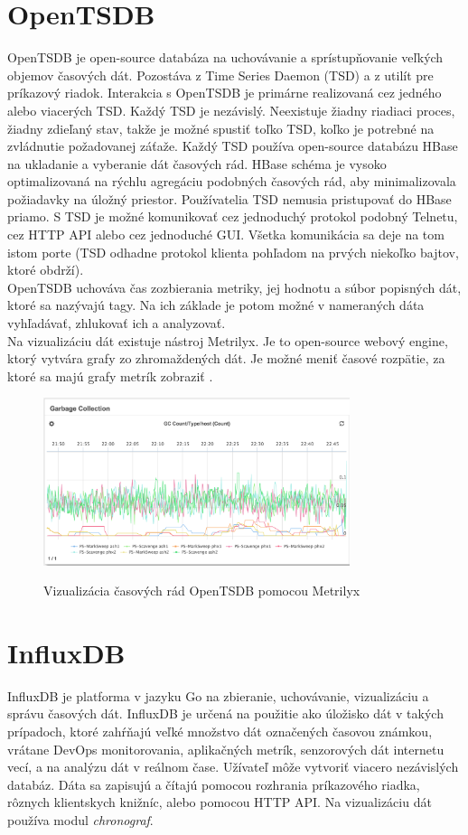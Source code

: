 \documentclass[11pt,final,oneside]{fithesis}
\begin{document}
\section{OpenTSDB}
OpenTSDB je open-source databáza na uchovávanie a sprístupňovanie veľkých objemov časových dát. Pozostáva z Time Series Daemon (TSD) a z utilít pre príkazový riadok. Interakcia s OpenTSDB je primárne realizovaná cez jedného alebo viacerých TSD. Každý TSD je nezávislý.
Neexistuje žiadny riadiaci proces, žiadny zdieľaný stav, takže je možné spustiť toľko TSD, koľko je potrebné na zvládnutie požadovanej záťaže. Každý TSD používa open-source databázu HBase
na ukladanie a vyberanie dát časových rád. HBase schéma je vysoko optimalizovaná na rýchlu agregáciu podobných časových rád, aby minimalizovala požiadavky na úložný priestor. 
Používatelia TSD nemusia pristupovať do HBase priamo. S TSD je možné komunikovať cez jednoduchý protokol podobný Telnetu, cez HTTP API alebo cez jednoduché GUI. Všetka komunikácia
sa deje na tom istom porte (TSD odhadne protokol klienta pohľadom na prvých niekoľko bajtov, ktoré obdrží).\cite{openTSDB}
\\OpenTSDB uchováva čas zozbierania metriky, jej hodnotu a súbor popisných dát, ktoré sa nazývajú tagy. Na ich základe je potom možné
v nameraných dáta vyhľadávať, zhlukovať ich a analyzovať.
\\Na vizualizáciu dát existuje nástroj Metrilyx. Je to open-source webový engine, ktorý vytvára grafy zo zhromaždených dát. Je možné meniť časové rozpätie, za ktoré sa majú grafy metrík zobraziť .
\begin{figure}[h]
\begin{center}
       \includegraphics[width=0.8\textwidth]{images/metrilyx.png}
       \caption{Vizualizácia časových rád OpenTSDB pomocou Metrilyx}\cite{Metrilyx}
\end{center}
\end{figure}

\section{InfluxDB}
InfluxDB je platforma v jazyku Go na zbieranie, uchovávanie, vizualizáciu a správu časových dát. InfluxDB je určená na použitie ako úložisko dát v takých prípadoch, ktoré zahŕňajú veľké množstvo
dát označených časovou známkou, vrátane DevOps monitorovania, aplikačných metrík, senzorových dát internetu vecí, a na analýzu dát v reálnom čase.\cite{21} Užívateľ môže vytvoriť viacero nezávislých databáz. 
Dáta sa zapisujú a čítajú pomocou rozhrania príkazového riadka, rôznych klientskych knižníc, alebo pomocou HTTP API. Na vizualizáciu dát používa modul \emph{chronograf}.
\end{document}
